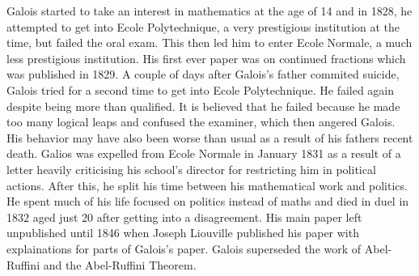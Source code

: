 Galois started to take an interest in mathematics at the age of 14 and in 1828, he attempted to get into Ecole Polytechnique, a very prestigious institution at the time, but failed the oral exam. This then led him to enter Ecole Normale, a much less prestigious institution. His first ever paper was on continued fractions which was published in 1829. A couple of days after Galois's father commited suicide, Galois tried for a second time to get into Ecole Polytechnique. He failed again despite being more than qualified. It is believed that he failed because he made too many logical leaps and confused the examiner, which then angered Galois. His behavior may have also been worse than usual as a result of his fathers recent death. Galios was expelled from Ecole Normale in January 1831 as a result of a letter heavily criticising his school's director for restricting him in political actions. After this, he split his time between his mathematical work and politics. He spent much of his life focused on politics instead of maths and died in duel in 1832 aged just 20 after getting into a disagreement. His main paper left unpublished until 1846 when Joseph Liouville published his paper with explainations for parts of Galois's paper. Galois superseded the work of Abel-Ruffini and the Abel-Ruffini Theorem.